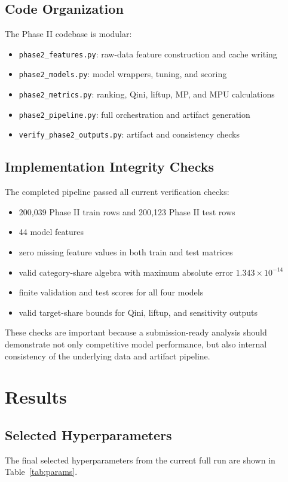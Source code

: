 \documentclass[11pt,a4paper]{article}
\begin{document}
\subsection{Code Organization}
The Phase II codebase is modular:
\begin{itemize}
    \item \texttt{phase2\_features.py}: raw-data feature construction and cache writing
    \item \texttt{phase2\_models.py}: model wrappers, tuning, and scoring
    \item \texttt{phase2\_metrics.py}: ranking, Qini, liftup, MP, and MPU calculations
    \item \texttt{phase2\_pipeline.py}: full orchestration and artifact generation
    \item \texttt{verify\_phase2\_outputs.py}: artifact and consistency checks
\end{itemize}

\subsection{Implementation Integrity Checks}
The completed pipeline passed all current verification checks:
\begin{itemize}
    \item 200{,}039 Phase II train rows and 200{,}123 Phase II test rows
    \item 44 model features
    \item zero missing feature values in both train and test matrices
    \item valid category-share algebra with maximum absolute error $1.343 \times 10^{-14}$
    \item finite validation and test scores for all four models
    \item valid target-share bounds for Qini, liftup, and sensitivity outputs
\end{itemize}

These checks are important because a submission-ready analysis should demonstrate not only competitive model performance, but also internal consistency of the underlying data and artifact pipeline.

\section{Results}
\subsection{Selected Hyperparameters}
The final selected hyperparameters from the current full run are shown in Table~\ref{tab:params}.
\end{document}
